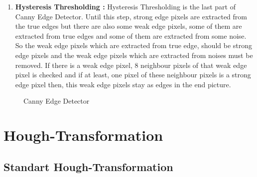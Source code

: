 \begin{enumerate}
\item \textbf{Hysteresis Thresholding : } Hysteresis Thresholding is the last part of Canny Edge Detector. Until this step, strong edge pixels are extracted from the true edges but there are also some weak edge pixels, some of them are extracted from true edges and some of them are extracted from some noise. So the weak edge pixels which are extracted from true edge, should be strong edge pixels and the weak edge pixels which are extracted from noises must be removed. If there is a weak edge pixel, 8 neighbour pixels of that weak edge pixel is checked and if at least, one pixel of these neighbour pixels is a strong edge pixel then, this weak edge pixels stay as edges in the end picture. 

\end{enumerate}


\begin{figure}[H]
  \centering
  \hfill
  \caption{Canny Edge Detector\cite{Canny_Edge_Detector}}
\end{figure} 





%
\section{Hough-Transformation}\label{sec:Hough-Transformation}
%

%
\subsection{Standart Hough-Transformation}\label{sec:Standart Hough - Transformation}
%


